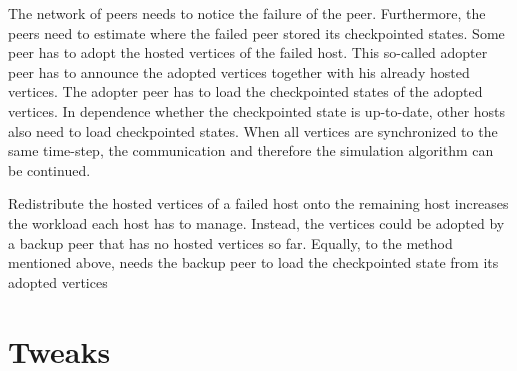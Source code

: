 The network of peers needs to notice the failure of the peer.
Furthermore, the peers need to estimate where the failed peer stored
its checkpointed states.  Some peer has to adopt the hosted vertices
of the failed host.  This so-called adopter peer has to announce the
adopted vertices together with his already hosted vertices.  The
adopter peer has to load the checkpointed states of the adopted
vertices. In dependence whether the checkpointed state is up-to-date,
other hosts also need to load checkpointed states. When all vertices
are synchronized to the same time-step, the communication and
therefore the simulation algorithm can be continued.


Redistribute the hosted vertices of a failed host onto the
remaining host increases the workload each host has to manage.
Instead, the vertices could be adopted by a backup peer that has no
hosted vertices so far.  Equally, to the method mentioned above,
needs the backup peer to load the checkpointed state from its
adopted vertices

\section*{Tweaks}



\cleardoublepage

